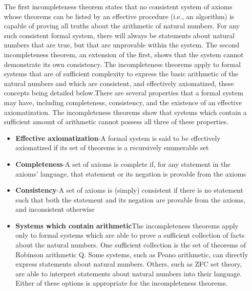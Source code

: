 \documentclass[a4paper]{article}
\begin{document}
The first incompleteness theorem states that no consistent system of axioms whose theorems can be listed by an effective procedure (i.e., an algorithm) is capable of proving all truths about the arithmetic of natural numbers. For any such consistent formal system, there will always be statements about natural numbers that are true, but that are unprovable within the system. The second incompleteness theorem, an extension of the first, shows that the system cannot demonstrate its own consistency.
The incompleteness theorems apply to formal systems that are of sufficient complexity to express the basic arithmetic of the natural numbers and which are consistent, and effectively axiomatized, these concepts being detailed below.There are several properties that a formal system may have, including completeness, consistency, and the existence of an effective axiomatization. The incompleteness theorems show that systems which contain a sufficient amount of arithmetic cannot possess all three of these properties.
\begin{itemize}
    \item \textbf{Effective axiomatization}-A formal system is said to be effectively axiomatized  if its set of theorems is a recursively enumerable set
    \item\textbf{Completeness}-A set of axioms is  complete if, for any statement in the axioms' language, that statement or its negation is provable from the axioms 
    \item\textbf{Consistency}-A set of axioms is (simply) consistent if there is no statement such that both the statement and its negation are provable from the axioms, and inconsistent otherwise
    \item\textbf{Systems which contain arithmetic}The incompleteness theorems apply only to formal systems which are able to prove a sufficient collection of facts about the natural numbers. One sufficient collection is the set of theorems of Robinson arithmetic Q. Some systems, such as Peano arithmetic, can directly express statements about natural numbers. Others, such as ZFC set theory, are able to interpret statements about natural numbers into their language. Either of these options is appropriate for the incompleteness theorems.
\end{itemize}

\end{document}
